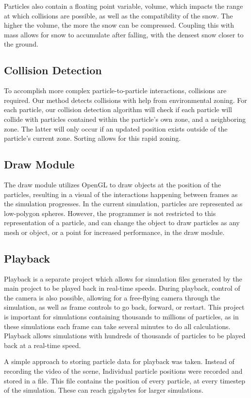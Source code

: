 \documentclass{acm_proc_article-sp}
\begin{document}
Particles also contain a floating point variable, volume, which impacts the range at which collisions are possible, as well as the compatibility of the snow. The higher the volume, the more the snow can be compressed. Coupling this with mass allows for snow to accumulate after falling, with the densest snow closer to the ground.

\subsection{Collision Detection}
To accomplish more complex particle-to-particle interactions, collisions are required. Our method detects collisions with help from environmental zoning. For each particle, our collision detection algorithm will check if each particle will collide with particles contained within the particle’s own zone, and a neighboring zone. The latter will only occur if an updated position exists outside of the particle’s current zone. Sorting allows for this rapid zoning.

\subsection{Draw Module}
The draw module utilizes OpenGL to draw objects at the position of the particles, resulting in a visual of the interactions happening between frames as the simulation progresses. In the current simulation, particles are represented as low-polygon spheres. However, the programmer is not restricted to this representation of a particle, and can change the object to draw particles as any mesh or object, or a point for increased performance, in the draw module. 

\subsection{Playback}
Playback is a separate project which allows for simulation files generated by the main project to be played back in real-time speeds. During playback, control of the camera is also possible, allowing for a free-flying camera through the simulation, as well as frame controls to go back, forward, or restart. This project is important for simulations containing thousands to millions of particles, as in these simulations each frame can take several minutes to do all calculations. Playback allows simulations with hundreds of thousands of particles to be played back at a real-time speed.

A simple approach to storing particle data for playback was taken. Instead of recording the video of the scene, Individual particle positions were recorded and stored in a file. This file contains the position of every particle, at every timestep of the simulation. These can reach gigabytes for larger simulations. 
\end{document}
